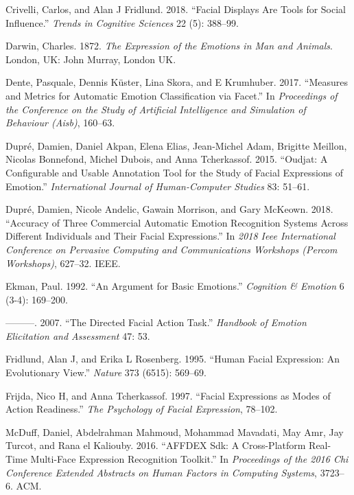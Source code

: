 \documentclass[conference,final,]{IEEEtran}
\begin{document}
\leavevmode\hypertarget{ref-crivelli2018facial}{}%
Crivelli, Carlos, and Alan J Fridlund. 2018. ``Facial Displays Are Tools
for Social Influence.'' \emph{Trends in Cognitive Sciences} 22 (5):
388--99.

\leavevmode\hypertarget{ref-darwin1872expression}{}%
Darwin, Charles. 1872. \emph{The Expression of the Emotions in Man and
Animals}. London, UK: John Murray, London UK.

\leavevmode\hypertarget{ref-dente2017measures}{}%
Dente, Pasquale, Dennis Küster, Lina Skora, and E Krumhuber. 2017.
``Measures and Metrics for Automatic Emotion Classification via Facet.''
In \emph{Proceedings of the Conference on the Study of Artificial
Intelligence and Simulation of Behaviour (Aisb)}, 160--63.

\leavevmode\hypertarget{ref-dupre2015oudjat}{}%
Dupré, Damien, Daniel Akpan, Elena Elias, Jean-Michel Adam, Brigitte
Meillon, Nicolas Bonnefond, Michel Dubois, and Anna Tcherkassof. 2015.
``Oudjat: A Configurable and Usable Annotation Tool for the Study of
Facial Expressions of Emotion.'' \emph{International Journal of
Human-Computer Studies} 83: 51--61.

\leavevmode\hypertarget{ref-dupre2018accuracy}{}%
Dupré, Damien, Nicole Andelic, Gawain Morrison, and Gary McKeown. 2018.
``Accuracy of Three Commercial Automatic Emotion Recognition Systems
Across Different Individuals and Their Facial Expressions.'' In
\emph{2018 Ieee International Conference on Pervasive Computing and
Communications Workshops (Percom Workshops)}, 627--32. IEEE.

\leavevmode\hypertarget{ref-ekman1992argument}{}%
Ekman, Paul. 1992. ``An Argument for Basic Emotions.'' \emph{Cognition
\& Emotion} 6 (3-4): 169--200.

\leavevmode\hypertarget{ref-ekman2007directed}{}%
---------. 2007. ``The Directed Facial Action Task.'' \emph{Handbook of
Emotion Elicitation and Assessment} 47: 53.

\leavevmode\hypertarget{ref-fridlund1995human}{}%
Fridlund, Alan J, and Erika L Rosenberg. 1995. ``Human Facial
Expression: An Evolutionary View.'' \emph{Nature} 373 (6515): 569--69.

\leavevmode\hypertarget{ref-frijda1997facial}{}%
Frijda, Nico H, and Anna Tcherkassof. 1997. ``Facial Expressions as
Modes of Action Readiness.'' \emph{The Psychology of Facial Expression},
78--102.

\leavevmode\hypertarget{ref-mcduff2016affdex}{}%
McDuff, Daniel, Abdelrahman Mahmoud, Mohammad Mavadati, May Amr, Jay
Turcot, and Rana el Kaliouby. 2016. ``AFFDEX Sdk: A Cross-Platform
Real-Time Multi-Face Expression Recognition Toolkit.'' In
\emph{Proceedings of the 2016 Chi Conference Extended Abstracts on Human
Factors in Computing Systems}, 3723--6. ACM.
\end{document}
